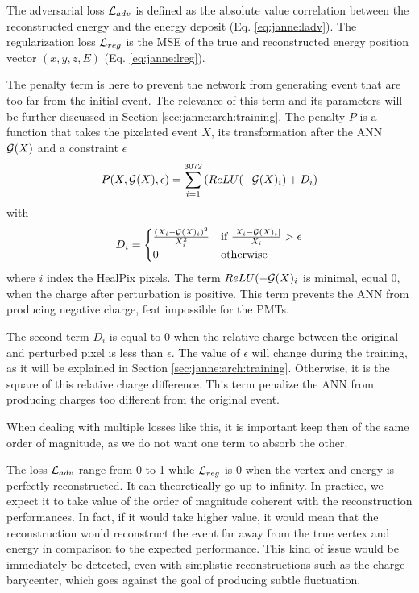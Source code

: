 \documentclass[../main.tex]{subfiles}
\begin{document}
The adversarial loss ${\cal L}_{adv}$ is defined as the absolute value correlation between the reconstructed energy and the energy deposit (Eq. \ref{eq:janne:ladv}). The regularization loss ${\cal L}_{reg}$ is the MSE of the true and reconstructed energy position vector $(x, y, z, E)$ (Eq. \ref{eq:janne:lreg}).

The penalty term is here to prevent the network from generating event that are too far from the initial event. The relevance of this term and its parameters will be further discussed in Section \ref{sec:janne:arch:training}. The penalty $P$ is a function that takes the pixelated event $X$, its transformation after the ANN ${\cal G}(X)$ and a constraint $\epsilon$
\begin{equation}
  P(X, {\cal G}(X), \epsilon) = \sum_{i=1}^{3072} \left( ReLU(-{\cal G}(X)_i) + D_i \right)
\end{equation}
with
\begin{equation}
  D_i = \begin{cases}
    \frac{(X_i - {\cal G}(X)_i)^2}{X_i^2}& \text{if } \frac{|X_i - {\cal G}(X)_i|}{X_i} > \epsilon \\
    0& \text{otherwise}
  \end{cases}
\end{equation}
where $i$ index the HealPix pixels. The term $ReLU(-{\cal G}(X)_i$ is minimal, equal 0, when the charge after perturbation is positive. This term prevents the ANN from producing negative charge, feat impossible for the PMTs.

The second term $D_i$ is equal to 0 when the relative charge between the original and perturbed pixel is less than $\epsilon$. The value of $\epsilon$ will change during the training, as it will be explained in Section \ref{sec:janne:arch:training}. Otherwise, it is the square of this relative charge difference. This term penalize the ANN from producing charges too different from the original event.
\hfill

When dealing with multiple losses like this, it is important keep then of the same order of magnitude, as we do not want one term to absorb the other.

The loss ${\cal L}_{adv}$ range from 0 to 1 while ${\cal L}_{reg}$ is 0 when the vertex and energy is perfectly reconstructed. It can theoretically go up to infinity. In practice, we expect it to take value of the order of magnitude coherent with the reconstruction performances. In fact, if it would take higher value, it would mean that the reconstruction would reconstruct the event far away from the true vertex and energy in comparison to the expected performance. This kind of issue would be immediately be detected, even with simplistic reconstructions such as the charge barycenter, which goes against the goal of producing subtle fluctuation.
\end{document}
